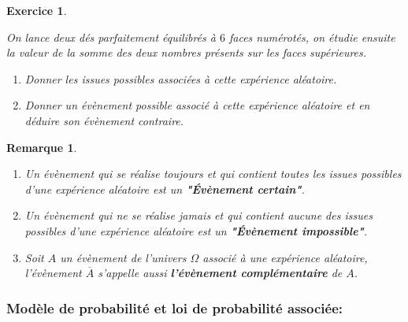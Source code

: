 \documentclass[a4paper,10.5pt]{article}
\newtheorem{defi}{Définition}
\newtheorem{rmq}{Remarque}
\newtheorem{exer}{Exercice}
\begin{document}
\begin{exer}\hfill\\[0.25cm]
\begin{minipage}[t]{1\linewidth}
	On lance deux dés parfaitement équilibrés à $6$ faces numérotés, on étudie ensuite la valeur de la somme des deux nombres présents sur les faces supérieures.
	\begin{enumerate}
		\item Donner les issues possibles associées à cette expérience aléatoire. 
		\item Donner un évènement possible associé à cette expérience aléatoire et en déduire son évènement contraire. 
	\end{enumerate} 
\end{minipage}
\end{exer}
\begin{rmq}\hfill\\[-0.25cm]
	\begin{minipage}[t]{0.9\linewidth}
		\begin{enumerate}[$\square$]
		\item Un évènement qui se réalise toujours et qui contient toutes les issues possibles d'une expérience aléatoire est un \textbf{"Évènement certain"}.
		\item Un évènement qui ne se réalise jamais et qui contient aucune des issues possibles d'une expérience aléatoire est un \textbf{"Évènement impossible"}.
		\item Soit $A$ un évènement de l'univers $\Omega$ associé à une expérience aléatoire, l'évènement $\overline{A}$ s'appelle aussi \textbf{l'évènement complémentaire} de $A$.
	\end{enumerate}
	\end{minipage}
\end{rmq}
\subsubsection{Modèle de probabilité et loi de probabilité associée:}
\noindent{}\hfill\\[0.5cm]
\end{document}
